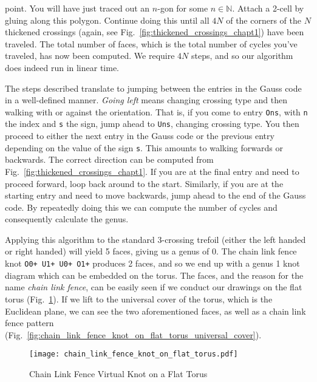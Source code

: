 \documentclass{article}
\theoremstyle{plain}
\begin{document}
        point. You will have just traced out an $n$-gon for some
        $n\in\mathbb{N}$. Attach a 2-cell by gluing along this polygon.
        Continue doing this until all $4N$ of the corners of the $N$ thickened
        crossings (again, see Fig.~\ref{fig:thickened_crossings_chapt1}) have
        been traveled. The total number of faces, which is the total number of
        cycles you've traveled, has now been computed. We require $4N$ steps,
        and so our algorithm does indeed run in linear time.
        \par\hfill\par
        The steps described translate to jumping between the entries in the
        Gauss code in a well-defined manner. \textit{Going left} means changing
        crossing type and then walking with or against the orientation.
        That is, if you come to entry \texttt{Ons}, with \texttt{n} the index
        and \texttt{s} the sign, jump ahead to \texttt{Uns}, changing crossing
        type. You then proceed to either the next entry in the Gauss code or
        the previous entry depending on the value of the sign \texttt{s}.
        This amounts to walking forwards or backwards. The correct direction
        can be computed from Fig.~\ref{fig:thickened_crossings_chapt1}.
        If you are at the final entry and need to proceed forward,
        loop back around to the
        start. Similarly, if you are at the starting entry and need to move
        backwards, jump ahead to the end of the Gauss code. By repeatedly
        doing this we can compute the number of cycles and consequently
        calculate the genus.
        \par\hfill\par
        Applying this algorithm to the standard 3-crossing trefoil (either the
        left handed or right handed) will yield 5 faces, giving us a genus of
        0. The chain link fence knot \texttt{O0+ U1+ U0+ O1+} produces 2 faces,
        and so we end up with a genus 1 knot diagram which can be embedded on
        the torus. The faces, and the reason for the name
        \textit{chain link fence}, can be easily seen if we conduct our drawings
        on the flat torus (Fig.~\ref{fig:chain_link_fence_knot_on_flat_torus}).
        If we lift to the universal cover of the torus, which is the Euclidean
        plane, we can see the two aforementioned faces, as well as a chain
        link fence pattern
        (Fig.~\ref{fig:chain_link_fence_knot_on_flat_torus_universal_cover}).
        \begin{figure}
            \centering
            \texttt{[image: chain\_link\_fence\_knot\_on\_flat\_torus.pdf]}
            \caption{Chain Link Fence Virtual Knot on a Flat Torus}
            \label{fig:chain_link_fence_knot_on_flat_torus}
        \end{figure}
\end{document}
